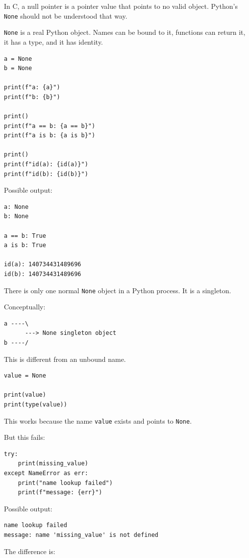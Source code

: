 In C, a null pointer is a pointer value that points to no valid object. Python's \texttt{None} should not be understood that way.

\texttt{None} is a real Python object. Names can be bound to it, functions can return it, it has a type, and it has identity.

\begin{verbatim}
a = None
b = None

print(f"a: {a}")
print(f"b: {b}")

print()
print(f"a == b: {a == b}")
print(f"a is b: {a is b}")

print()
print(f"id(a): {id(a)}")
print(f"id(b): {id(b)}")
\end{verbatim}

Possible output:

\begin{verbatim}
a: None
b: None

a == b: True
a is b: True

id(a): 140734431489696
id(b): 140734431489696
\end{verbatim}

There is only one normal \texttt{None} object in a Python process. It is a singleton.

Conceptually:

\begin{verbatim}
a ----\
      ---> None singleton object
b ----/
\end{verbatim}

This is different from an unbound name.

\begin{verbatim}
value = None

print(value)
print(type(value))
\end{verbatim}

This works because the name \texttt{value} exists and points to \texttt{None}.

But this fails:

\begin{verbatim}
try:
    print(missing_value)
except NameError as err:
    print("name lookup failed")
    print(f"message: {err}")
\end{verbatim}

Possible output:

\begin{verbatim}
name lookup failed
message: name 'missing_value' is not defined
\end{verbatim}

The difference is:


